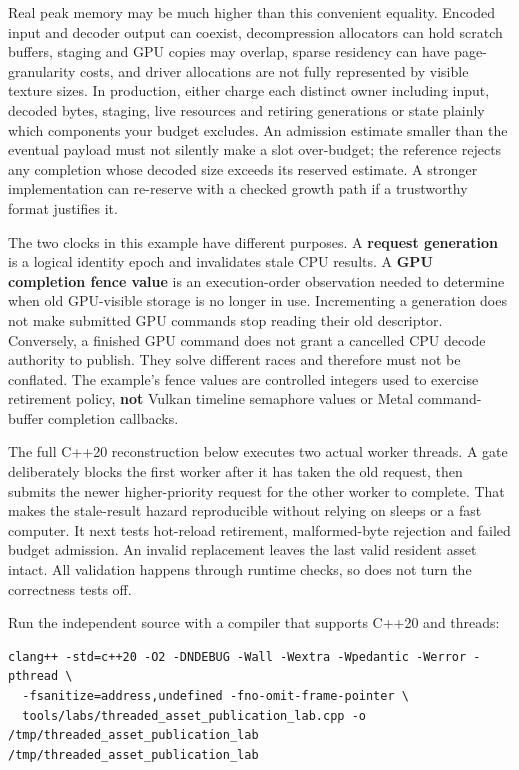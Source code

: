 Real peak memory may be much higher than this convenient equality. Encoded input and decoder output can coexist, decompression allocators can hold scratch buffers, staging and GPU copies may overlap, sparse residency can have page-granularity costs, and driver allocations are not fully represented by visible texture sizes. In production, either charge each distinct owner including input, decoded bytes, staging, live resources and retiring generations or state plainly which components your budget excludes. An admission estimate smaller than the eventual payload must not silently make a slot over-budget; the reference rejects any completion whose decoded size exceeds its reserved estimate. A stronger implementation can re-reserve with a checked growth path if a trustworthy format justifies it.

The two clocks in this example have different purposes. A \textbf{request generation} is a logical identity epoch and invalidates stale CPU results. A \textbf{GPU completion fence value} is an execution-order observation needed to determine when old GPU-visible storage is no longer in use. Incrementing a generation does not make submitted GPU commands stop reading their old descriptor. Conversely, a finished GPU command does not grant a cancelled CPU decode authority to publish. They solve different races and therefore must not be conflated. The example's fence values are controlled integers used to exercise retirement policy, \textbf{not} Vulkan timeline semaphore values or Metal command-buffer completion callbacks.

The full C++20 reconstruction below executes two actual worker threads. A  gate deliberately blocks the first worker after it has taken the old request, then submits the newer higher-priority request for the other worker to complete. That makes the stale-result hazard reproducible without relying on sleeps or a fast computer. It next tests hot-reload retirement, malformed-byte rejection and failed budget admission. An invalid replacement leaves the last valid resident asset intact. All validation happens through runtime checks, so  does not turn the correctness tests off.

Run the independent source with a compiler that supports C++20 and threads:

\begin{verbatim}
clang++ -std=c++20 -O2 -DNDEBUG -Wall -Wextra -Wpedantic -Werror -pthread \
  -fsanitize=address,undefined -fno-omit-frame-pointer \
  tools/labs/threaded_asset_publication_lab.cpp -o /tmp/threaded_asset_publication_lab
/tmp/threaded_asset_publication_lab
\end{verbatim}

